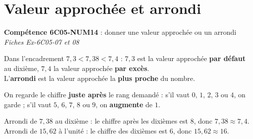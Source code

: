 \documentclass[11pt]{article}
\newcommand{\comp}[2]{\par\smallskip\noindent\colorbox{gray!15}{\parbox{\dimexpr\linewidth-2\fboxsep}{\small\textbf{Compétence #1} : #2}}\par\smallskip}
\begin{document}
\section{Valeur approchée et arrondi}
\comp{6C05-NUM14}{donner une valeur approchée ou un arrondi \hfill \textit{Fiches Ex-6C05-07 et 08}}

\begin{definition}
Dans l'encadrement $7,3 < 7,38 < 7,4$ :
$7,3$ est la valeur approchée \textbf{par défaut} au dixième, $7,4$ la valeur approchée \textbf{par excès}.\\
L'\textbf{arrondi} est la valeur approchée la \textbf{plus proche} du nombre.
\end{definition}

\begin{propriete}[Arrondir]
On regarde le chiffre \textbf{juste après} le rang demandé :
s'il vaut $0$, $1$, $2$, $3$ ou $4$, on garde ; s'il vaut $5$, $6$, $7$, $8$ ou $9$, on \textbf{augmente} de $1$.
\end{propriete}

\begin{exemple}
Arrondi de $7,38$ au dixième : le chiffre après les dixièmes est $8$, donc $7,38 \approx 7,4$.\\
Arrondi de $15,62$ à l'unité : le chiffre des dixièmes est $6$, donc $15,62 \approx 16$.
\end{exemple}

\fi
\end{document}
